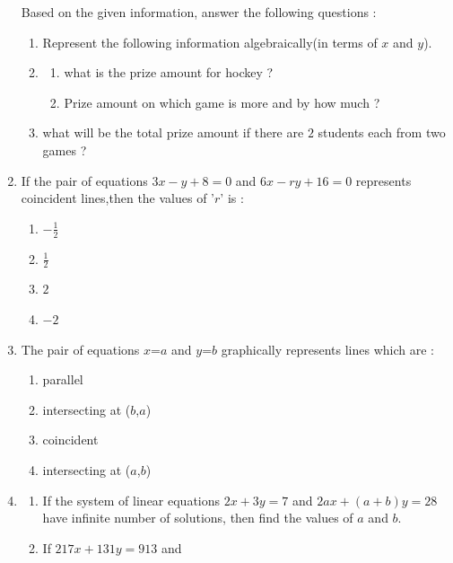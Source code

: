 \documentclass[12pt,-letter paper]{article}\usepackage{siunitx}
\begin{document}
\begin{enumerate}
Based on the given information, answer the following questions :
\begin{enumerate}[label=(\roman*)]
    \item Represent the following information algebraically(in terms of \textit{$x$} and \textit{$y$}).
    \item\begin{enumerate}[label=(\alph*)]
\item what is the prize amount for hockey ?
\item Prize amount on which game is more and by how much ?
    \end{enumerate}
    \item what will be the total prize amount if there are $2$ students each from two games ?
\end{enumerate}
\pagebreak
\item If the pair of equations $3x - y + 8 = 0$ and $6x - ry +16 =0$ represents coincident lines,then the values of '\textit{$r$}' is :
\begin{enumerate}[label=(\alph*)]
    \item $-\frac{1}{2}$
    \item $\frac{1}{2}$
    \item $2$
    \item $-2$
\end{enumerate}
\item The pair of equations $x$=$a$ and $y$=$b$ graphically represents lines which are :
\begin{enumerate}[label=(\alph*)]
    \item parallel
    \item intersecting at ($b$,$a$)
    \item coincident
    \item intersecting at ($a$,$b$)  
\end{enumerate}
\item
\begin{enumerate}[label=(\alph*)]
\item If the system of linear equations \hspace{4pt} 
$2x + 3y = 7$\hspace{4pt}   and  \hspace{4pt} $2ax +(a + b)y =28$ \hspace{4pt}
have infinite number of solutions, then find the values of $a$ and $b$.
\item  If\hspace{2pt} $217x + 131y = 913$ and \hspace{2pt} 

\end{enumerate}
\end{enumerate}
\end{document}
